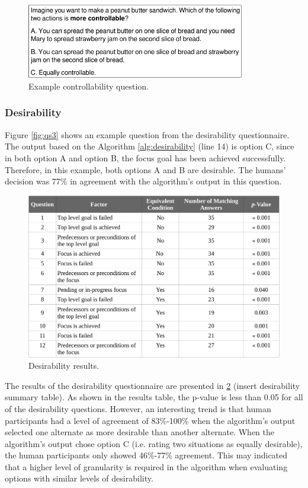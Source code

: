 \documentclass[12pt]{report}
\begin{document}
\begin{figure}[tbh]
  \centering
  \includegraphics[width=0.85\textwidth]{figure/question-sample2-croped.pdf}
  \caption{{Example controllability question.}}
  \label{fig:qs2}
\end{figure}

\subsubsection{Desirability}
\label{sec:desirability-crowdsourcing}
Figure \ref{fig:qs3} shows an example question from the desirability
questionnaire. The output based on the Algorithm \ref{alg:desirability}
(line 14) is option C, since in both option A and option B, the focus goal
has been achieved successfully. Therefore, in this example, both options A and B
are desirable. The humans' decision was 77\% in agreement with the algorithm's
output in this question.

\begin{figure}[tbh]
  \centering
  \includegraphics[width=1\textwidth]{figure/desirability_result_croped.pdf}
  \caption{Desirability results.}
  \label{fig:desirability_result}
\end{figure}

The results of the desirability questionnaire are presented in
\ref{fig:desirability_result} (insert desirability summary table). As shown in
the results table, the p-value is less than 0.05 for all of the desirability
questions. However, an interesting trend is that human participants had a level
of agreement of 83\%-100\% when the algorithm's output selected one alternate as
more desirable than another alternate. When the algorithm's output chose option
C (i.e. rating two situations as equally desirable), the human participants only
showed 46\%-77\% agreement. This may indicated that a higher level of
granularity is required in the algorithm when evaluating options with similar
levels of desirability.
\end{document}

